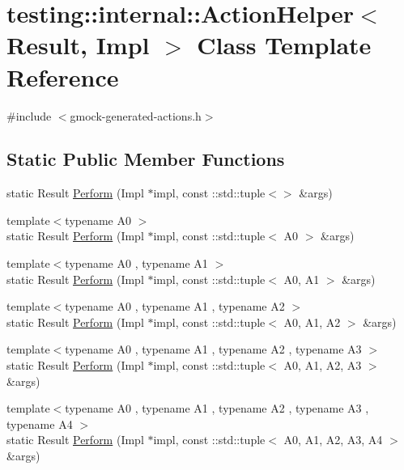 \hypertarget{classtesting_1_1internal_1_1_action_helper}{}\section{testing\+::internal\+::Action\+Helper$<$ Result, Impl $>$ Class Template Reference}
\label{classtesting_1_1internal_1_1_action_helper}


{\ttfamily \#include $<$gmock-\/generated-\/actions.\+h$>$}

\subsection*{Static Public Member Functions}
\begin{DoxyCompactItemize}
\item 
static Result \mbox{\hyperlink{classtesting_1_1internal_1_1_action_helper_a8f81ab5a5ae6b762ffbb23f8f33b9980}{Perform}} (Impl $\ast$impl, const \+::std\+::tuple$<$$>$ \&args)
\item 
{\footnotesize template$<$typename A0 $>$ }\\static Result \mbox{\hyperlink{classtesting_1_1internal_1_1_action_helper_aa02169413facf7b60dd6d63bdeacb389}{Perform}} (Impl $\ast$impl, const \+::std\+::tuple$<$ A0 $>$ \&args)
\item 
{\footnotesize template$<$typename A0 , typename A1 $>$ }\\static Result \mbox{\hyperlink{classtesting_1_1internal_1_1_action_helper_a71147b30081c44d7d2c776c1781b797c}{Perform}} (Impl $\ast$impl, const \+::std\+::tuple$<$ A0, A1 $>$ \&args)
\item 
{\footnotesize template$<$typename A0 , typename A1 , typename A2 $>$ }\\static Result \mbox{\hyperlink{classtesting_1_1internal_1_1_action_helper_a1f47357f6879b2517b60a3de30c2c634}{Perform}} (Impl $\ast$impl, const \+::std\+::tuple$<$ A0, A1, A2 $>$ \&args)
\item 
{\footnotesize template$<$typename A0 , typename A1 , typename A2 , typename A3 $>$ }\\static Result \mbox{\hyperlink{classtesting_1_1internal_1_1_action_helper_abeefd0482a2e8349cbfd3223eeda503d}{Perform}} (Impl $\ast$impl, const \+::std\+::tuple$<$ A0, A1, A2, A3 $>$ \&args)
\item 
{\footnotesize template$<$typename A0 , typename A1 , typename A2 , typename A3 , typename A4 $>$ }\\static Result \mbox{\hyperlink{classtesting_1_1internal_1_1_action_helper_a79d7d411d9d2149076d8ab672757c9e9}{Perform}} (Impl $\ast$impl, const \+::std\+::tuple$<$ A0, A1, A2, A3, A4 $>$ \&args)
$$
\end{DoxyCompactItemize}
